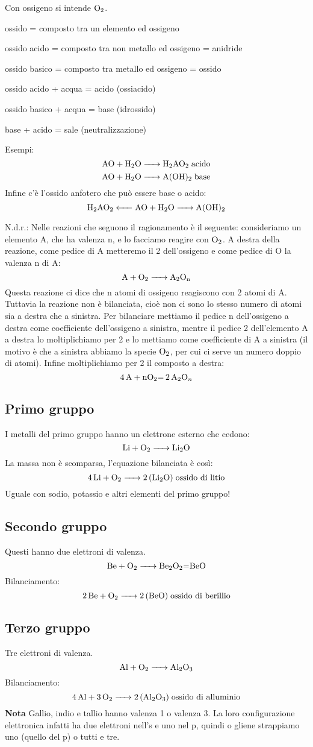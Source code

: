 Con ossigeno si intende \(\ce{ O2 }\).

ossido = composto tra un elemento ed ossigeno

ossido acido = composto tra non metallo ed ossigeno = anidride

ossido basico = composto tra metallo ed ossigeno = ossido

ossido acido + acqua = acido (ossiacido)

ossido basico + acqua = base (idrossido)

base + acido = sale (neutralizzazione)

Esempi:
$$\ce{ AO + H2O -> H2AO2 } \; \text{acido}$$ 
$$\ce{ AO + H2O -> A(OH)_2 } \; \text{base}$$
Infine c'è l'ossido anfotero che può essere base o acido:
$$\ce{ H_2AO_2 <- AO + H_2O -> A(OH)_2 }$$

N.d.r.: Nelle reazioni che seguono il ragionamento è il seguente: consideriamo un elemento A, che ha valenza n, e lo facciamo reagire con $\rm O_2$. A destra della reazione, come pedice di A metteremo il 2 dell'ossigeno e come pedice di O la valenza n di A:
$$\ce{A + O_2 -> A_2O_{\text{n}}}$$
Questa reazione ci dice che n atomi di ossigeno reagiscono con 2 atomi di A. Tuttavia la reazione non è bilanciata, cioè non ci sono lo stesso numero di atomi sia a destra che a sinistra. Per bilanciare mettiamo il pedice n dell'ossigeno a destra come coefficiente dell'ossigeno a sinistra, mentre il pedice 2 dell'elemento A a destra lo moltiplichiamo per 2 e lo mettiamo come coefficiente di A a sinistra (il motivo è che a sinistra abbiamo la specie $\rm O_2$, per cui ci serve un numero doppio di atomi). Infine moltiplichiamo per 2 il composto a destra:
$$\ce{4A + nO_2= 2A_2O_n}$$

\subsection{Primo gruppo}
I metalli del primo gruppo hanno un elettrone esterno che cedono:
$$\ce{ Li + O_2 -> Li_2O }$$
La massa non è scomparsa, l'equazione bilanciata è così:
$$\ce{ 4 Li + O_2 -> 2 (Li_2O) } \; \text{ossido di litio}$$
Uguale con sodio, potassio e altri elementi del primo gruppo!
\subsection{Secondo gruppo}
Questi hanno due elettroni di valenza.
$$\ce{ Be + O_2 -> Be_2O_2=BeO }$$
Bilanciamento:
$$\ce{ 2 Be + O_2 -> 2 (BeO) } \; \text{ossido di berillio}$$
\subsection{Terzo gruppo}
Tre elettroni di valenza.
$$\ce{ Al + O_2 -> Al_2O_3 }$$
Bilanciamento:
$$\ce{ 4 Al + 3O_2 -> 2 (Al_2O_3)} \; \text{ossido di alluminio}$$
\textbf{Nota} Gallio, indio e tallio hanno valenza 1 o valenza 3. La loro configurazione elettronica infatti ha due elettroni nell's e uno nel p, quindi o gliene strappiamo uno (quello del p) o tutti e tre.

